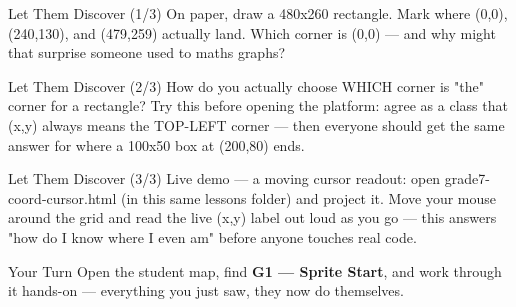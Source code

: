 \documentclass[aspectratio=169]{beamer}
\begin{document}
\begin{frame}{Let Them Discover (1/3)}
    \Large
    On paper, draw a 480x260 rectangle. Mark where (0,0), (240,130), and (479,259) actually land. Which corner is (0,0) — and why might that surprise someone used to maths graphs?
\end{frame}


\begin{frame}{Let Them Discover (2/3)}
    \Large
    How do you actually choose WHICH corner is "the" corner for a rectangle? Try this before opening the platform: agree as a class that (x,y) always means the TOP-LEFT corner — then everyone should get the same answer for where a 100x50 box at (200,80) ends.
\end{frame}


\begin{frame}{Let Them Discover (3/3)}
    \Large
    Live demo — a moving cursor readout: open grade7-coord-cursor.html (in this same lessons folder) and project it. Move your mouse around the grid and read the live (x,y) label out loud as you go — this answers "how do I know where I even am" before anyone touches real code.
\end{frame}

\begin{frame}{Your Turn}
    \Large
    Open the student map, find \textbf{G1 — Sprite Start}, and work through it
    hands-on --- everything you just saw, they now do themselves.
\end{frame}
\end{document}

